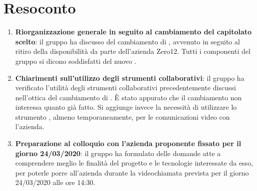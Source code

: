 \documentclass{article}
\begin{document}
\section{Resoconto}%
\label{resoconto}
\begin{enumerate}
  \item \textbf{Riorganizzazione generale in seguito al cambiamento del capitolato scelto}: il gruppo ha discusso del cambiamento di , avvenuto in seguito al ritiro della disponibilità
  da parte dell'azienda Zero12. Tutti i componenti del gruppo si dicono soddisfatti del nuovo .
  \item \textbf{Chiarimenti sull'utilizzo degli strumenti collaborativi}: il gruppo ha verificato l'utilità degli strumenti collaborativi precedentemente discussi nell'ottica del cambiamento di . È stato appurato
  che il cambiamento non interessa quanto già fatto. Si aggiunge invece la necessità di utilizzare lo strumento , almeno temporaneamente, per le comunicazioni video con l'azienda.
  \item \textbf{Preparazione al colloquio con l'azienda proponente fissato per il giorno 24/03/2020}: il gruppo ha formulato delle domande atte a comprendere meglio le finalità del progetto e le tecnologie
  interessate da esso, per poterle porre all'azienda durante la videochiamata prevista per il giorno 24/03/2020 alle ore 14:30.
\end{enumerate}
\end{document}
